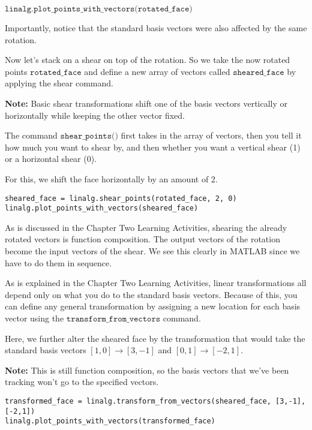 \documentclass{ximera}
\begin{document}
\begin{exploration}
$\texttt{linalg.plot\_points\_with\_vectors(rotated\_face)}$

Importantly, notice that the standard basis vectors were also affected by the same rotation.

Now let's stack on a shear on top of the rotation. So we take the now rotated points $\texttt{rotated\_face}$ and define a new array of vectors called $\texttt{sheared\_face}$ by applying the shear command.

\textbf{Note:} Basic shear transformations shift one of the basis vectors vertically or horizontally while keeping the other vector fixed.

The command $\texttt{shear\_points()}$ first takes in the array of vectors, then you tell it how much you want to shear by, and then whether you want a vertical shear (1) or a horizontal shear (0).

For this, we shift the face horizontally by an amount of 2.
\begin{verbatim}
sheared_face = linalg.shear_points(rotated_face, 2, 0)
linalg.plot_points_with_vectors(sheared_face)
\end{verbatim}

As is discussed in the Chapter Two Learning Activities, shearing the already rotated vectors is function composition. The output vectors of the rotation become the input vectors of the shear. We see this clearly in MATLAB since we have to do them in sequence.

As is explained in the Chapter Two Learning Activities, linear transformations all depend only on what you do to the standard basis vectors. Because of this, you can define any general transformation by assigning a new location for each basis vector using the $\texttt{transform\_from\_vectors}$ command.

Here, we further alter the sheared face by the transformation that would take the standard basis vectors \([1,0] \rightarrow [3,-1]\) and \([0,1] \rightarrow [-2,1]\).

\textbf{Note:} This is still function composition, so the basis vectors that we've been tracking won't go to the specified vectors.
\begin{verbatim}
transformed_face = linalg.transform_from_vectors(sheared_face, [3,-1], [-2,1])
linalg.plot_points_with_vectors(transformed_face)
\end{verbatim}

\end{exploration}
\end{document}
